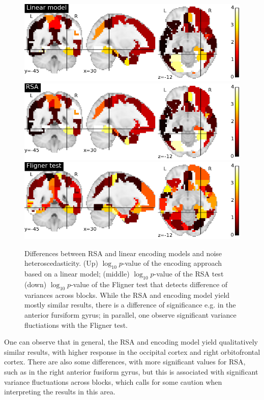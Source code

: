 \documentclass{article}
\begin{document}
\begin{figure}[t]
\includegraphics[width=\linewidth]{figures/lm.png}
\includegraphics[width=\linewidth]{figures/rsa.png}
\includegraphics[width=\linewidth]{figures/var_stat.png}
\caption{ Differences between RSA and linear encoding models and noise
  heteroscedasticity.  (Up) $\log_{10}p$-value of the encoding
  approach based on a linear model; (middle) $\log_{10}p$-value of the
  RSA test (down) $\log_{10}p$-value of the Fligner test that detects
  difference of variances across blocks. While the RSA and encoding
  model yield mostly similar results, there is a difference of
  significance e.g. in the anterior fursiform gyrus; in parallel, one
  observe significant variance fluctiations with the Fligner
  test.}
\label{fig:haxby}
\end{figure}

One can observe that in general, the RSA and encoding model yield
qualitatively similar results, with higher response in the occipital
cortex and right orbitofrontal cortex. 
%
There are also some differences, with more significant values for RSA,
such as in the right anterior fusiform gyrus, but this is associated
with significant variance fluctuations across blocks, which calls for
some caution when interpreting the results in this area.
\end{document}
